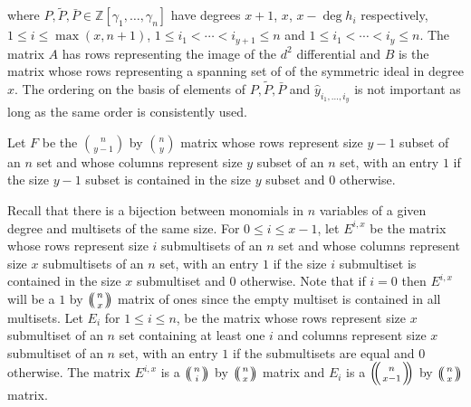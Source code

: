 \documentclass{article}
\theoremstyle{plain}
\theoremstyle{definition}
\numberwithin{thm}{section}
\begin{document}
				where $P,\tilde{P},\bar{P}\in \mathbb{Z}[\gamma_1,\dots,\gamma_n]$ have degrees $x+1$, $x$, $x-\deg{h_i}$ respectively, $1\leq i \leq \max(x,n+1)$,
				$1\leq i_1<\cdots<i_{y+1}\leq n$ and $1\leq {i}_1<\cdots<{i}_y\leq n$.
				The matrix $A$ has rows representing the image of the $d^2$ differential
				and $B$ is the matrix whose rows representing a spanning set of of the symmetric ideal in degree $x$.
				The ordering on the basis of elements of $P,\tilde{P},\bar{P}$ and $\hat{y}_{i_1,\dots,i_y}$ is not important as long as the same order is consistently used.
				
				Let $F$ be the $\binom{n}{y-1}$ by $\binom{n}{y}$ matrix whose rows represent size $y-1$ subset of an $n$ set
				and whose columns represent size $y$ subset of an $n$ set,
				with an entry $1$ if the size $y-1$ subset is contained in the size $y$ subset and $0$ otherwise.
				
				Recall that there is a bijection between monomials in $n$ variables of a given degree and multisets of the same size.
				For $0\leq i \leq x-1$, let $E^{i,x}$ be the matrix whose rows represent size $i$ submultisets of an $n$ set
				and whose columns represent size $x$ submultisets of an $n$ set,
				with an entry $1$ if the size $i$ submultiset is contained in the size $x$ submultiset and $0$ otherwise.
				Note that if $i=0$ then $E^{i,x}$ will be a $1$ by ${\ensuremath{\left(\kern-.3em\left(\genfrac{}{}{0pt}{}{{n}}{{x}}\right)\kern-.3em\right)}}$ matrix of ones since the empty multiset is contained in all multisets.  
				Let $E_i$ for $1\leq i \leq n$, be the matrix whose rows represent size $x$ submultiset of an $n$ set containing at least one $i$
				and columns represent size $x$ submultiset of an $n$ set,
				with an entry $1$ if the submultisets are equal and $0$ otherwise.
				The matrix $E^{i,x}$ is a ${\ensuremath{\left(\kern-.3em\left(\genfrac{}{}{0pt}{}{{n}}{{i}}\right)\kern-.3em\right)}}$ by ${\ensuremath{\left(\kern-.3em\left(\genfrac{}{}{0pt}{}{{n}}{{x}}\right)\kern-.3em\right)}}$ matrix and $E_i$ is a ${\ensuremath{\left(\kern-.3em\left(\genfrac{}{}{0pt}{}{{n}}{{x-1}}\right)\kern-.3em\right)}}$ by ${\ensuremath{\left(\kern-.3em\left(\genfrac{}{}{0pt}{}{{n}}{{x}}\right)\kern-.3em\right)}}$ matrix.
				
\end{document}
